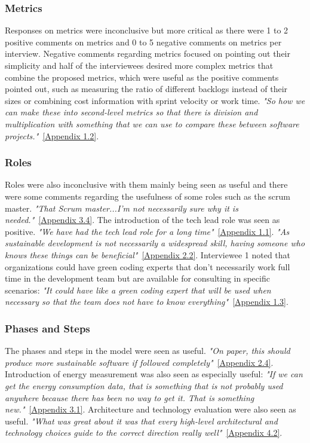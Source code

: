 \subsubsection{Metrics}
Responses on metrics were inconclusive but more critical as there were 1 to 2 positive comments on metrics and 0 to 5 negative comments on metrics per interview. Negative comments regarding metrics focused on pointing out their simplicity and half of the interviewees desired more complex metrics that combine the proposed metrics, which were useful as the positive comments pointed out, such as measuring the ratio of different backlogs instead of their sizes or combining cost information with sprint velocity or work time. \textit{"So how we can make these into second-level metrics so that there is division and multiplication with something that we can use to compare these between software projects."}~\hyperref[i12]{[Appendix 1.2]}.

\subsubsection{Roles}
Roles were also inconclusive with them mainly being seen as useful and there were some comments regarding the usefulness of some roles such as the scrum master. \textit{"That Scrum master...I'm not necessarily sure why it is needed."}~\hyperref[i34]{[Appendix 3.4]}. The introduction of the tech lead role was seen as positive. \textit{"We have had the tech lead role for a long time"}~\hyperref[i11]{[Appendix 1.1]}. \textit{"As sustainable development is not necessarily a widespread skill, having someone who knows these things can be beneficial"}~\hyperref[i22]{[Appendix 2.2]}. Interviewee 1 noted that organizations could have green coding experts that don't necessarily work full time in the development team but are available for consulting in specific scenarios: \textit{"It could have like a green coding expert that will be used when necessary so that the team does not have to know everything"}~\hyperref[i13]{[Appendix 1.3]}.

\subsubsection{Phases and Steps}
The phases and steps in the model were seen as useful. \textit{"On paper, this should produce more sustainable software if followed completely"}~\hyperref[i24]{[Appendix 2.4]}. Introduction of energy measurement was also seen as especially useful: \textit{"If we can get the energy consumption data, that is something that is not probably used anywhere because there has been no way to get it. That is something new."}~\hyperref[i31]{[Appendix 3.1]}. Architecture and technology evaluation were also seen as useful. \textit{"What was great about it was that every high-level architectural and technology choices guide to the correct direction really well"}~\hyperref[i42]{[Appendix 4.2]}.


